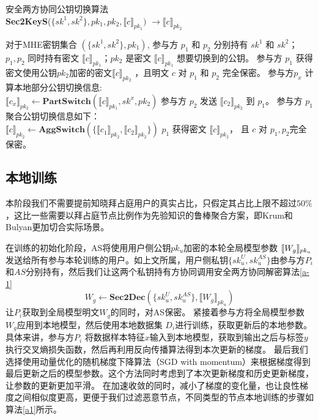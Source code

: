 \begin{algorithm}[htbp]
	\caption{安全两方协同公钥切换算法\\ \textbf{Sec2KeyS}($\{sk^1, sk^2\}, pk_1, pk_2, \llbracket c\rrbracket_{pk_1})$ $\rightarrow \llbracket c\rrbracket_{pk_2}$}
	\label{a-2}
	\begin{algorithmic}[1]
		\REQUIRE 对于MHE密钥集合 $(\{sk^1, sk^2\}, pk_1)$, 参与方 $p_1$ 和 $p_2$ 分别持有 $sk^1$ 和 $sk^2$；$p_1, p_2$ 同时持有密文 $\llbracket c\rrbracket_{pk_1}$；$pk_2$ 是密文 $\llbracket c\rrbracket_{pk_1}$ 想要切换到的公钥。
		\ENSURE 参与方 $p_1$ 获得密文使用公钥$pk_2$加密的密文$\llbracket c\rrbracket_{pk_2}$ ，且明文 $c$ 对 $p_1$ 和 $p_2$ 完全保密。
		\STATE  参与方$p_x$ 计算本地部分公钥切换信息:\\ $\llbracket c_x\rrbracket_{pk_2} \leftarrow \textbf{PartSwitch}(\llbracket c\rrbracket_{pk_1}, sk^x, pk_2)$
		\ENDFOR
		\STATE 参与方 $p_2$ 发送 $\llbracket c_2\rrbracket_{pk_2}$ 到 $p_1$。
		\STATE 参与方 $p_1$ 聚合公钥切换信息如下：\\ $\llbracket c\rrbracket_{pk_2} \leftarrow \textbf{AggSwitch}(\{\llbracket c_1\rrbracket_{pk_2}, \llbracket c_2\rrbracket_{pk_2} \})$
		\RETURN $ p_1 $ 获得密文 $\llbracket c\rrbracket_{pk_2}$， 且 $c$ 对 $ p_1, p_2 $完全保密。
	\end{algorithmic}
\end{algorithm}

\subsection{本地训练}
本阶段我们不需要提前知晓拜占庭用户的真实占比，只假定其占比上限不超过$50\%$，这比一些需要以拜占庭节点比例作为先验知识的鲁棒聚合方案，即Krum\cite{blanchard2017machine}和Bulyan\cite{guerraoui2018hidden}更加切合实际场景。

在训练的初始化阶段，AS将使用用户侧公钥$ pk_u $加密的本轮全局模型参数
$ \ctx[pk_u]{W_g} $发送给所有参与本轮训练的用户。如上文所属，用户侧私钥$\{sk_u^{U}, sk_u^{AS}\}$由参与方$P_i$和$AS$分别持有，然后我们让这两个私钥持有方协同调用安全两方协同解密算法\ref{a-1}
\begin{equation}\label{dec}
	W_g \leftarrow \textbf{Sec2Dec}(\{sk_u^U, sk_u^{AS}\}, \llbracket W_g\rrbracket_{pk_u})
\end{equation}
让$ P_i $获取到全局模型明文$ W_g $的同时，对AS保密。
紧接着参与方将全局模型参数$ W_g $应用到本地模型，然后使用本地数据集
$ D_i $进行训练，获取更新后的本地参数。具体来讲，参与方$P_i$ 将数据样本特征$x$输入到本地模型，获取到输出之后与标签$ y $执行交叉熵损失函数，然后再利用反向传播算法得到本次更新的梯度。
最后我们选择使用动量优化的随机梯度下降算法（SGD with momentum）来根据梯度得到最后更新之后的模型参数。这个方法同时考虑到了本次更新梯度和历史更新梯度，让参数的更新更加平滑。
在加速收敛的同时，减小了梯度的变化量，也让良性梯度之间相似度更高，更便于我们过滤恶意节点，不同类型的节点本地训练的步骤如算法\ref{a1}所示。

